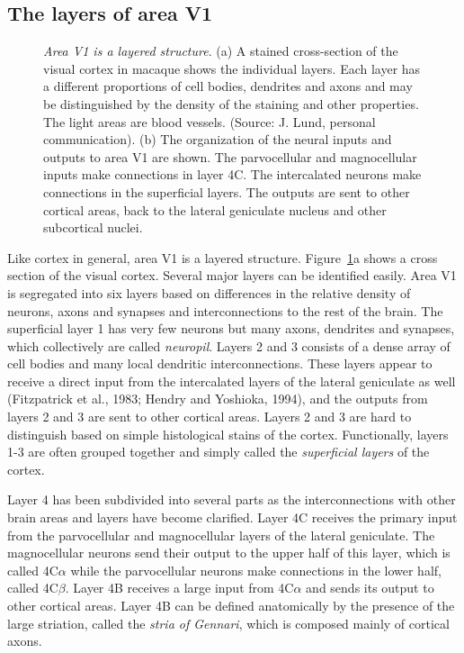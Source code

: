 \subsection*{The layers of area V1}
\begin{figure}
\centerline{
}
\caption[The layers of area V1]{
{\em Area V1 is a layered structure}.
(a) A stained cross-section of the visual cortex in macaque
shows the individual layers.
Each layer has a different proportions of cell bodies,
dendrites and axons and may be distinguished by the density
of the staining and other properties.
The light areas are blood vessels.
(Source: J. Lund, personal communication).
(b) The organization of the
neural inputs and outputs to area V1 are shown.
The parvocellular and magnocellular inputs make connections
in layer 4C.
The intercalated neurons make connections in the superficial layers.
The outputs are sent to other cortical areas,
back to the lateral geniculate nucleus and other subcortical
nuclei.
}
\label{f5:cortexLayers}
\end{figure}
Like cortex in general, area V1 is a layered structure.
Figure~\ref{f5:cortexLayers}a shows a cross section of the visual
cortex.
Several major layers can be identified easily.
Area V1 is segregated into six layers
based on differences in the relative density of neurons,
axons and synapses and 
interconnections to the rest of the brain.
The superficial layer 1 has very few neurons but many
axons, dendrites and synapses, which collectively are called
{\em neuropil}.
Layers 2 and 3 consists of a dense array of cell bodies
and many local dendritic interconnections.
These layers appear to receive a direct input from the
intercalated layers of the lateral geniculate as well
(Fitzpatrick et al., 1983; Hendry and Yoshioka, 1994),
and the outputs from layers 2 and 3
are sent to other cortical areas.
Layers 2 and 3 are hard to distinguish based on simple
histological stains of the cortex.
Functionally, layers 1-3 are often grouped
together and simply called the {\em superficial layers} of the cortex.

Layer 4 has been subdivided into several parts as the
interconnections with other brain
areas and layers have become clarified.
Layer 4C receives the primary input from the
parvocellular and magnocellular layers of the lateral geniculate.
The magnocellular neurons send their output to the upper
half of this layer, which is called 4C$\alpha$ while the
parvocellular neurons make connections in the lower half,
called 4C$\beta$.
Layer 4B receives a large input from 4C$\alpha$ and sends its
output to other cortical areas.
Layer 4B can be defined anatomically by the presence of the
large striation, called the {\em stria of Gennari},
which is composed mainly of cortical axons.

